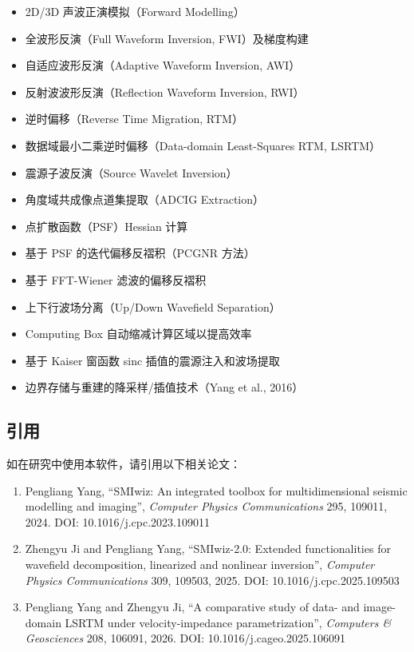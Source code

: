\documentclass[11pt,a4paper]{ctexart}
\begin{document}
\begin{itemize}
  \item 2D/3D 声波正演模拟（Forward Modelling）
  \item 全波形反演（Full Waveform Inversion, FWI）及梯度构建
  \item 自适应波形反演（Adaptive Waveform Inversion, AWI）
  \item 反射波波形反演（Reflection Waveform Inversion, RWI）
  \item 逆时偏移（Reverse Time Migration, RTM）
  \item 数据域最小二乘逆时偏移（Data-domain Least-Squares RTM, LSRTM）
  \item 震源子波反演（Source Wavelet Inversion）
  \item 角度域共成像点道集提取（ADCIG Extraction）
  \item 点扩散函数（PSF）Hessian 计算
  \item 基于 PSF 的迭代偏移反褶积（PCGNR 方法）
  \item 基于 FFT-Wiener 滤波的偏移反褶积
  \item 上下行波场分离（Up/Down Wavefield Separation）
  \item Computing Box 自动缩减计算区域以提高效率
  \item 基于 Kaiser 窗函数 sinc 插值的震源注入和波场提取
  \item 边界存储与重建的降采样/插值技术（Yang et al., 2016）
\end{itemize}

\subsection{引用}

如在研究中使用本软件，请引用以下相关论文：

\begin{enumerate}
  \item Pengliang Yang, ``SMIwiz: An integrated toolbox for multidimensional seismic modelling and imaging'', \emph{Computer Physics Communications} 295, 109011, 2024. DOI: 10.1016/j.cpc.2023.109011
  \item Zhengyu Ji and Pengliang Yang, ``SMIwiz-2.0: Extended functionalities for wavefield decomposition, linearized and nonlinear inversion'', \emph{Computer Physics Communications} 309, 109503, 2025. DOI: 10.1016/j.cpc.2025.109503
  \item Pengliang Yang and Zhengyu Ji, ``A comparative study of data- and image-domain LSRTM under velocity-impedance parametrization'', \emph{Computers \& Geosciences} 208, 106091, 2026. DOI: 10.1016/j.cageo.2025.106091
\end{enumerate}
\end{document}
